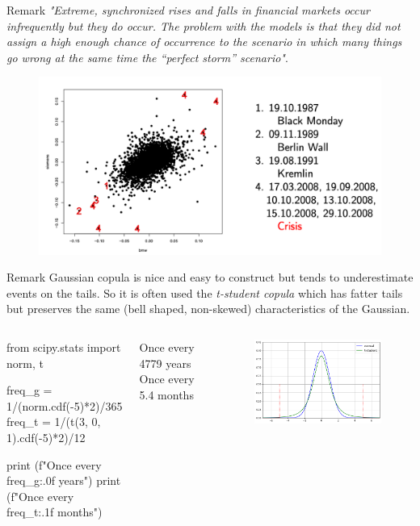 \documentclass{beamer}
\begin{document}
\begin{frame}{Remark}
  \emph{"Extreme, synchronized rises and falls in financial markets occur
infrequently but they do occur. The problem with the models is that
they did not assign a high enough chance of occurrence to the scenario
in which many things go wrong at the same time the “perfect storm” scenario"}.
  \begin{figure}[h]
    \begin{center}
      \includegraphics[width=0.7\linewidth]{crisis}
    \end{center}
  \end{figure}
\end{frame}

\begin{frame}[fragile]{Remark}
  Gaussian copula is nice and easy to construct but tends to underestimate events on the tails. So it is often used the \emph{t-student copula} which has fatter tails but preserves the same (bell shaped, non-skewed) characteristics of the Gaussian.
  \begin{columns}
  \begin{ipython}
from scipy.stats import norm, t

freq_g = 1/(norm.cdf(-5)*2)/365
freq_t = 1/(t(3, 0, 1).cdf(-5)*2)/12

print (f"Once every {freq_g:.0f} years")
print (f"Once every {freq_t:.1f} months")
\end{ipython}
\begin{ioutput}
Once every 4779 years
Once every 5.4 months
\end{ioutput}
\begin{figure}[h]
  \begin{center}
    \includegraphics[width=0.9\linewidth]{gauss_vs_t}
  \end{center}
\end{figure}
\end{columns}
\end{frame}
\end{document}
